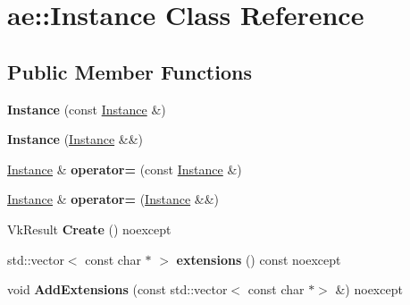 \hypertarget{classae_1_1_instance}{}\section{ae\+:\+:Instance Class Reference}
\label{classae_1_1_instance}
\subsection*{Public Member Functions}
\begin{DoxyCompactItemize}
\item 
\hypertarget{classae_1_1_instance_a48d480419ea5ee601db2bacf7b6d48d2}{}\label{classae_1_1_instance_a48d480419ea5ee601db2bacf7b6d48d2} 
{\bfseries Instance} (const \hyperlink{classae_1_1_instance}{Instance} \&)
\item 
\hypertarget{classae_1_1_instance_ac0b8b262e4aa1e2ff3eb0e8839f9868c}{}\label{classae_1_1_instance_ac0b8b262e4aa1e2ff3eb0e8839f9868c} 
{\bfseries Instance} (\hyperlink{classae_1_1_instance}{Instance} \&\&)
\item 
\hypertarget{classae_1_1_instance_ad01e1dd78cb36b0a112770281a836f19}{}\label{classae_1_1_instance_ad01e1dd78cb36b0a112770281a836f19} 
\hyperlink{classae_1_1_instance}{Instance} \& {\bfseries operator=} (const \hyperlink{classae_1_1_instance}{Instance} \&)
\item 
\hypertarget{classae_1_1_instance_a2d73116829ee705a15c32f9e7c113524}{}\label{classae_1_1_instance_a2d73116829ee705a15c32f9e7c113524} 
\hyperlink{classae_1_1_instance}{Instance} \& {\bfseries operator=} (\hyperlink{classae_1_1_instance}{Instance} \&\&)
\item 
\hypertarget{classae_1_1_instance_a9de8fa013e11a71aa6e09f142aa1a927}{}\label{classae_1_1_instance_a9de8fa013e11a71aa6e09f142aa1a927} 
Vk\+Result {\bfseries Create} () noexcept
\item 
\hypertarget{classae_1_1_instance_a0aaff634cda5a58a37ae93b2f577721d}{}\label{classae_1_1_instance_a0aaff634cda5a58a37ae93b2f577721d} 
std\+::vector$<$ const char $\ast$ $>$ {\bfseries extensions} () const noexcept
\item 
\hypertarget{classae_1_1_instance_a880ed1eaf9b821ac616865821a5f15ef}{}\label{classae_1_1_instance_a880ed1eaf9b821ac616865821a5f15ef} 
void {\bfseries Add\+Extensions} (const std\+::vector$<$ const char $\ast$$>$ \&) noexcept
\item 
\hypertarget{classae_1_1_instance_a1546a926e92a106a3829ce6b8729de42}{}\label{classae_1_1_instance_a1546a926e92a106a3829ce6b8729de42} 
$$
\end{DoxyCompactItemize}
